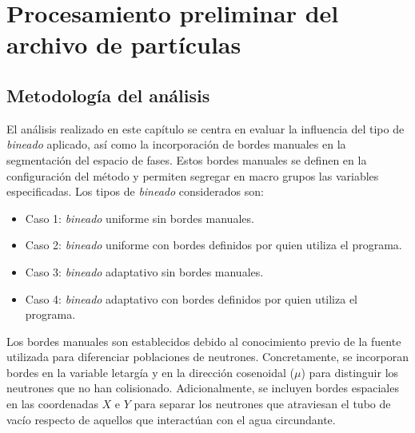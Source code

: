 \section{Procesamiento preliminar del archivo de partículas}
\subsection{Metodología del análisis}
\label{sec:metodologia-analisis}

El análisis realizado en este capítulo se centra en evaluar la influencia del tipo de \textit{bineado} aplicado, así como la incorporación de bordes manuales en la segmentación del espacio de fases. Estos bordes manuales se definen en la configuración del método y permiten segregar en macro grupos las variables especificadas. Los tipos de \textit{bineado} considerados son:


\begin{itemize}
    \item Caso 1: \textit{bineado} uniforme sin bordes manuales.
    \item Caso 2: \textit{bineado} uniforme con bordes definidos por quien utiliza el programa.
    \item Caso 3: \textit{bineado} adaptativo sin bordes manuales.
    \item Caso 4: \textit{bineado} adaptativo con bordes definidos por quien utiliza el programa.
\end{itemize}

Los bordes manuales son establecidos debido al conocimiento previo de la fuente utilizada para diferenciar poblaciones de neutrones. Concretamente, se incorporan bordes en la variable letargía y en la dirección cosenoidal ($\mu$) para distinguir los neutrones que no han colisionado. Adicionalmente, se incluyen bordes espaciales en las coordenadas $X$ e $Y$ para separar los neutrones que atraviesan el tubo de vacío respecto de aquellos que interactúan con el agua circundante.

